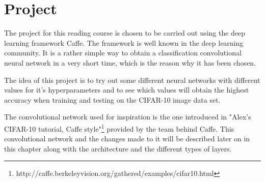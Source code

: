 \graphicspath{{Chapters/Project/}}

\chapter{Project}

The project for this reading course is chosen to be carried out using the deep learning framework Caffe. The framework is well known in the deep learning community. It is a rather simple way to obtain a classification convolutional neural network in a very short time, which is the reason why it has been chosen.

The idea of this project is to try out some different neural networks with different values for it's hyperparameters and to see which values will obtain the highest accuracy when training and testing on the CIFAR-10 image data set.

The convolutional network used for inspiration is the one introduced in "Alex's CIFAR-10 tutorial, Caffe style"\footnote{http://caffe.berkeleyvision.org/gathered/examples/cifar10.html} provided by the team behind Caffe. This convolutional network and the changes made to it will be described later on in this chapter along with the architecture and the different types of layers.







